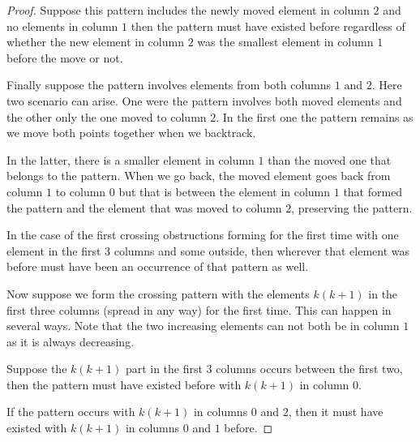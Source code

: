 \begin{proof}
Suppose this pattern includes the newly moved element in column $2$ and no elements in column $1$ then the pattern must have existed before regardless of whether the new element in column $2$ was the smallest element in column $1$ before the move or not.

\begin{center}

\end{center}

Finally suppose the pattern involves elements from both columns $1$ and $2$. Here two scenario can arise. One were the pattern involves both moved elements and the other only the one moved to column $2$. In the first one the pattern remains as we move both points together when we backtrack.

\begin{center}

\end{center}

In the latter, there is a smaller element in column $1$ than the moved one that belongs to the pattern. When we go back, the moved element goes back from column $1$ to column $0$ but that is between the element in column $1$ that formed the pattern and the element that was moved to column $2$, preserving the pattern.

\begin{center}

\end{center}

In the case of the first crossing obstructions forming for the first time with one element in the first 3 columns and some outside, then wherever that element was before must have been an occurrence of that pattern as well.

Now suppose we form the crossing pattern with the elements $k(k+1)$ in the first three columns (spread in any way) for the first time. This can happen in several ways. Note that the two increasing elements can not both be in column $1$ as it is always decreasing.

Suppose the $k(k+1)$ part in the first $3$ columns occurs between the first two, then the pattern must have existed before with $k(k+1)$ in column $0$.

\begin{center}

\end{center}

If the pattern occurs with $k(k+1)$ in columns $0$ and $2$, then it must have existed with $k(k+1)$ in columns $0$ and $1$ before.


\end{proof}
